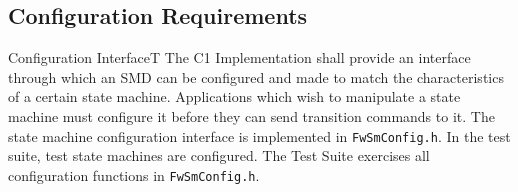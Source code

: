 \documentclass[requirements]{../fwprofile}
\begin{document}
\subsection{Configuration Requirements}\label{req:configInterface}

\begin{fw_req}{Configuration Interface}{T}
{The C1 Implementation shall provide an interface through which an SMD can be configured and made to match 
the characteristics of a certain state machine.}
{Applications which wish to manipulate a state machine must configure it before they can send transition commands to it.}
{The state machine configuration interface is implemented in \texttt{FwSmConfig.h}.} 
{In the test suite, test state machines are configured. The Test Suite exercises all configuration 
functions in \texttt{FwSmConfig.h}.}
\end{fw_req}
\end{document}
